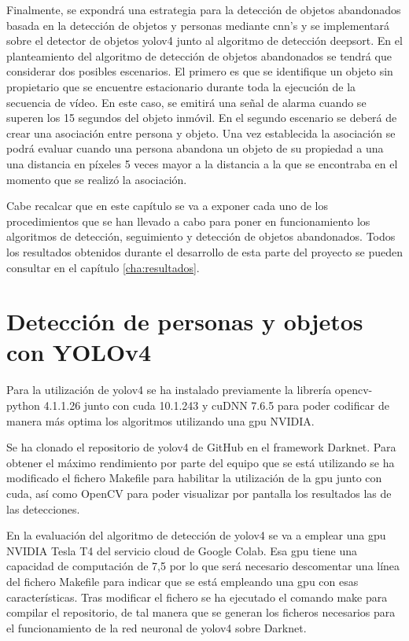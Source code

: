 Finalmente, se expondrá una estrategia para la detección de objetos abandonados basada en la detección de objetos y personas mediante \gls{cnn}'s y se implementará sobre el detector de objetos \gls{yolov4} junto al algoritmo de detección \gls{deepsort}. En el planteamiento del algoritmo de detección de objetos abandonados se tendrá que considerar dos posibles escenarios. El primero es que se identifique un objeto sin propietario que se encuentre estacionario durante toda la ejecución de la secuencia de vídeo. En este caso, se emitirá una señal de alarma cuando se superen los 15 segundos del objeto inmóvil. En el segundo escenario se deberá de crear una asociación entre persona y objeto. Una vez establecida la asociación se podrá evaluar cuando una persona abandona un objeto de su propiedad a una una distancia en píxeles 5 veces mayor a la distancia a la que se encontraba en el momento que se realizó la asociación.

Cabe recalcar que en este capítulo se va a exponer cada uno de los procedimientos que se han llevado a cabo para poner en funcionamiento los algoritmos de detección, seguimiento y detección de objetos abandonados. Todos los resultados obtenidos durante el desarrollo de esta parte del proyecto se pueden consultar en el capítulo \ref{cha:resultados}.

\section{Detección de personas y objetos con YOLOv4}
\label{sec:desarrollo-yolov4}

Para la utilización de \gls{yolov4} se ha instalado previamente la librería opencv-python 4.1.1.26 junto con \gls{cuda} 10.1.243 y cuDNN 7.6.5 para poder codificar de manera más optima los algoritmos utilizando una \gls{gpu} NVIDIA.

Se ha clonado el repositorio de \gls{yolov4} de GitHub \cite{yolov4-darknet-github} en el framework Darknet. Para obtener el máximo rendimiento por parte del equipo que se está utilizando se ha modificado el fichero Makefile para habilitar la utilización de la \gls{gpu} junto con \gls{cuda}, así como OpenCV para poder visualizar por pantalla los resultados las de las detecciones.

En la evaluación del algoritmo de detección de \gls{yolov4} se va a emplear una \gls{gpu} NVIDIA Tesla T4 del servicio cloud de Google Colab. Esa \gls{gpu} tiene una capacidad de computación de 7,5 por lo que será necesario descomentar una línea del fichero Makefile para indicar que se está empleando una \gls{gpu} con esas características. Tras modificar el fichero se ha ejecutado el comando make para compilar el repositorio, de tal manera que se generan los ficheros necesarios para el funcionamiento de la red neuronal de \gls{yolov4} sobre Darknet. 

